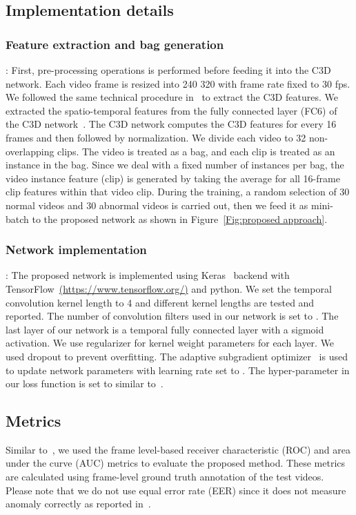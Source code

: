 \documentclass[journal]{IEEEtran}
\begin{document}
\subsection{Implementation details}
\subsubsection{Feature extraction and bag generation}:
First, pre-processing operations is performed before feeding it into the C3D network. Each video frame is resized into 240  320 with frame rate fixed to 30 fps. We followed the same technical procedure in~\cite{sultani2018real} to extract the C3D features. We extracted the spatio-temporal features from the fully connected layer (FC6) of the C3D  network~\cite{tran2015learning}. The C3D network computes the C3D features for every 16 frames and then followed by  normalization. We divide each video to 32 non-overlapping clips. The video is treated as a bag, and each clip is treated as an instance in the bag. Since we deal with a fixed number of instances per bag, the video instance feature (clip) is generated by taking the average for all 16-frame clip features within that video clip. During the training, a random selection of 30 normal videos and 30 abnormal videos is carried out,  then we feed it as mini-batch to the proposed network as shown in Figure~\ref{Fig:proposed approach}.

\subsubsection{Network implementation}:
The proposed network is implemented using Keras~\cite{chollet2015keras} backend with TensorFlow~\url{(https://www.tensorflow.org/)} and python. We set the temporal convolution kernel length to 4 and different kernel lengths are tested and reported. The number of convolution filters used in our network is set to . The last layer of our network is a temporal fully connected layer with a sigmoid activation. We use  regularizer for kernel weight parameters for each layer. We used dropout to prevent overfitting. The adaptive subgradient optimizer~\cite{duchi2011adaptive} is used to update network parameters with learning rate set to . The  hyper-parameter in our loss function is set to  similar to~\cite{sultani2018real}.



\subsection{Metrics} Similar to~\cite{sultani2018real,ionescu2019object,Abati_2019_CVPR}, we used the frame level-based receiver characteristic (ROC) and area under the curve (AUC) metrics to evaluate the proposed method. These metrics are calculated using frame-level ground truth annotation of the test videos. Please note that we do not use equal error rate (EER) since it does not measure anomaly correctly as reported in~\cite{sultani2018real,li2013anomaly}.
\end{document}
